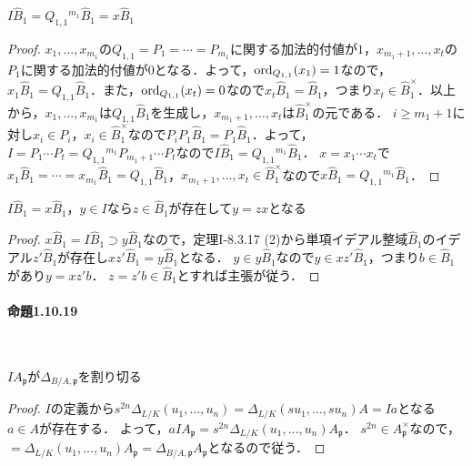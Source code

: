 \begin{screen}
  $I\widehat{B}_1=Q_{1,1}{}^{m_1}\widehat{B}_1=x\widehat{B}_1$
\end{screen}
\begin{proof}
  $x_1,\ldots,x_{m_1}$の$Q_{1,1}=P_1=\cdots=P_{m_1}$に関する加法的付値が$1$，$x_{m_1+1},\ldots,x_t$の$P_1$に関する加法的付値が$0$となる．よって，$\operatorname{ord}_{Q_{1,1}}(x_1)=1$なので，$x_1\widehat{B}_1=Q_{1,1}\widehat{B}_1$．また，$\operatorname{ord}_{Q_{1,1}}(x_t)=0$なので$x_t\widehat{B}_1=\widehat{B}_1$，つまり$x_t\in\widehat{B}_1^\times$．以上から，$x_1,\ldots,x_{m_1}$は$Q_{1,1}\widehat{B}_1$を生成し，$x_{m_1+1},\ldots,x_t$は$\widehat{B}_1^\times$の元である．
  $i\geq m_1+1$に対し$x_i \in P_i$，$x_i\in\widehat{B}_1^\times$なので$P_iP_1\widehat{B}_1=P_1\widehat{B}_1$．よって，$I=P_1\cdots P_t=Q_{1,1}{}^{m_1}P_{m_1+1}\cdots P_t$なので$I\widehat{B}_1=Q_{1,1}{}^{m_1}\widehat{B}_1$．
  $x=x_1\cdots x_t$で$x_1\widehat{B}_1=\cdots=x_{m_1}\widehat{B}_1=Q_{1,1}\widehat{B}_1$，$x_{m_1+1},\ldots,x_t\in\widehat{B}_1^\times$なので$x\widehat{B}_1=Q_{1,1}{}^{m_1}\widehat{B}_1$．
\end{proof}

\begin{screen}
  $I\widehat{B}_1=x\widehat{B}_1$，$y\in I$なら$z\in\widehat{B}_1$が存在して$y=zx$となる
\end{screen}
\begin{proof}
  $x\widehat{B}_1=I\widehat{B}_1\supset y\widehat{B}_1$なので，定理I-8.3.17 (2)から単項イデアル整域$\widehat{B}_1$のイデアル$z'\widehat{B}_1$が存在し$xz'\widehat{B}_1=y\widehat{B}_1$となる．
  $y\in y\widehat{B}_1$なので$y\in xz'\widehat{B}_1$，つまり$b\in\widehat{B}_1$があり$y=xz'b$．
  $z=z'b\in\widehat{B}_1$とすれば主張が従う．
\end{proof}

\paragraph{命題1.10.19}~
\begin{screen}
  $IA_\mathfrak{p}$が$\varDelta_{B/A,\mathfrak{p}}$を割り切る
\end{screen}
\begin{proof}
  $I$の定義から$s^{2n}\varDelta_{L/K}(u_1,\ldots,u_n)=\varDelta_{L/K}(su_1,\ldots,su_n)A=Ia$となる$a\in A$が存在する．
  よって，$aIA_\mathfrak{p}=s^{2n}\varDelta_{L/K}(u_1,\ldots,u_n)A_\mathfrak{p}$．
  $s^{2n}\in A_\mathfrak{p}^\times$なので，$=\varDelta_{L/K}(u_1,\ldots,u_n)A_\mathfrak{p}=\varDelta_{B/A,\mathfrak{p}}A_\mathfrak{p}$となるので従う．
\end{proof}


